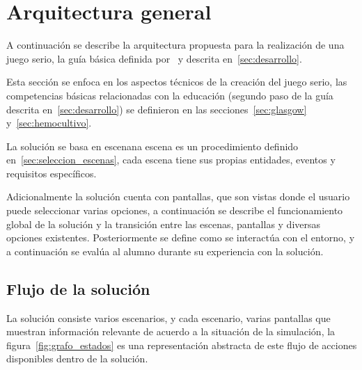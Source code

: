 
\section{Arquitectura general}
\label{sec:solucion}


A continuación se describe la arquitectura propuesta para la realización de una
juego serio,  la guía básica definida
por~\cite{pereira2009design} y descrita en~\ref{sec:desarrollo}.

Esta sección se enfoca en los aspectos técnicos de la creación del juego serio,
las competencias básicas relacionadas con la educación (segundo paso de la guía
descrita en~\ref{sec:desarrollo}) se definieron en las
secciones~\ref{sec:glasgow} y~\ref{sec:hemocultivo}.

La solución se basa en escenana escena es un procedimiento definido
en~\ref{sec:seleccion_escenas}, cada escena tiene sus propias entidades, eventos
y requisitos específicos. 


Adicionalmente la solución cuenta con pantallas, que son vistas donde el usuario
puede seleccionar varias opciones, a continuación se describe el funcionamiento
global de la solución y la transición entre las escenas, pantallas y diversas
opciones existentes. Posteriormente se define como se interactúa con el entorno,
y a continuación se evalúa al alumno durante su experiencia con la solución.

\subsection{Flujo de la solución}

La solución consiste varios escenarios, y cada escenario,  varias pantallas que muestran información relevante de acuerdo a
la situación de la simulación, la figura~\ref{fig:grafo_estados} es una
representación abstracta de este flujo de acciones disponibles dentro de la
solución.

